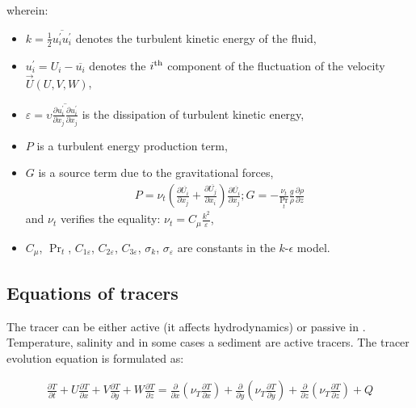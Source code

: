 wherein:
\begin{itemize}
\item $k=\frac{1}{2} \overline{u_{i}^{'} u_{i}^{'} }$ denotes the turbulent
kinetic energy of the fluid,

\item $u_{i}^{'} =U_{i} -\overline{u_{i} }$ denotes the ${i}^{\rm{th}}$ component
of the fluctuation of the velocity $\vec{U} (U,V,W)$,

\item $\varepsilon =\upsilon \overline{\frac{\partial u_{i}^{'} }{\partial
x_{j} } \frac{\partial u_{i}^{'} }{\partial x_{j} } }$ is the dissipation of
turbulent kinetic energy,

\item $P$ is a turbulent energy production term,

\item $G$ is a source term due to the gravitational forces,
\begin{align}
P=\nu _{t} \left(\frac{\partial \overline{U_{i}
}}{\partial x_{j} } +\frac{\partial \overline{U_{j} }}{\partial x_{i} }
\right)\frac{\partial \overline{U_{i} }}{\partial x_{j} } ; G = -
\frac{\nu _{t} }{\Pr _{t} } \frac{g}{\rho } \frac{\partial \rho
}{\partial z}
\end{align}
and $\nu _{t} $ verifies the equality: $\nu _{t} =C_{\mu }
\frac{k^{2} }{\varepsilon } $,

\item $C_{\mu }$, $\Pr _{t}$, $C_{1\varepsilon }$, $C_{2\varepsilon }$,
$C_{3\varepsilon }$,  $\sigma _{k}$, $\sigma _{\varepsilon }$ are constants in
the $k$-$\epsilon$ model.
\end{itemize}

\subsection{Equations of tracers}

The tracer can be either active (it affects hydrodynamics) or passive in
. Temperature, salinity and in some cases a sediment are active
tracers. The tracer evolution equation is formulated as:

\begin{align}
\frac{\partial T}{\partial t} +U\frac{\partial T}{\partial x}
+V\frac{\partial T}{\partial y} +W\frac{\partial T}{\partial z}
=\frac{\partial }{\partial x}
\left(\nu _{T} \frac{\partial T}{\partial x} \right)
+\frac{\partial }{\partial y}
\left(\nu _{T} \frac{\partial T}{\partial y} \right)
+\frac{\partial }{\partial z}
\left(\nu _{T} \frac{\partial T}{\partial z} \right)+Q
\end{align}

